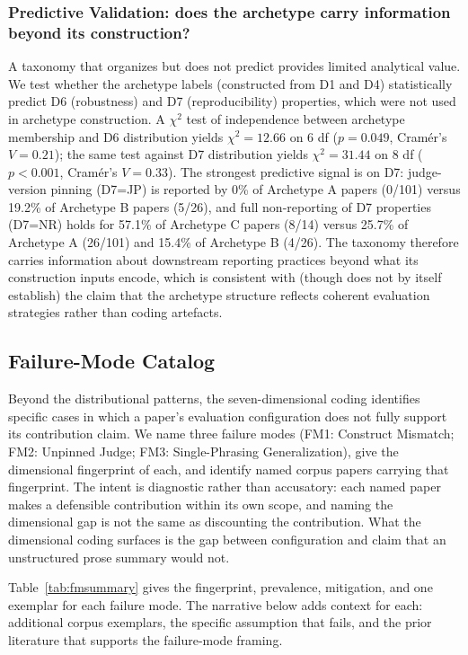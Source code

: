 \documentclass[acmsmall, nonacm, screen]{acmart}
\begin{document}
\subsubsection{Predictive Validation: does the archetype carry information beyond its construction?}
\label{subsubsec:predictive}
A taxonomy that organizes but does not predict provides limited
analytical value. We test whether the archetype labels (constructed
from D1 and D4) statistically predict D6 (robustness) and D7
(reproducibility) properties, which were not used in archetype
construction. A $\chi^2$ test of independence between archetype
membership and D6 distribution yields $\chi^2 = 12.66$ on 6 df
($p = 0.049$, Cram\'er's $V = 0.21$); the same test against D7
distribution yields $\chi^2 = 31.44$ on 8 df ($p < 0.001$,
Cram\'er's $V = 0.33$). The strongest predictive signal is on D7:
judge-version pinning (D7=JP) is reported by 0\% of Archetype A
papers (0/101) versus 19.2\% of Archetype B papers (5/26), and full
non-reporting of D7 properties (D7=NR) holds for 57.1\% of Archetype
C papers (8/14) versus 25.7\% of Archetype A (26/101) and 15.4\% of
Archetype B (4/26). The taxonomy therefore carries information about
downstream reporting practices beyond what its construction inputs
encode, which is consistent with (though does not by itself
establish) the claim that the archetype structure reflects coherent
evaluation strategies rather than coding artefacts.

\subsection{Failure-Mode Catalog}
\label{subsec:failuremodes}

Beyond the distributional patterns, the seven-dimensional coding
identifies specific cases in which a paper's evaluation configuration
does not fully support its contribution claim. We name three failure
modes (FM1: Construct Mismatch; FM2: Unpinned Judge; FM3:
Single-Phrasing Generalization), give the dimensional fingerprint of
each, and identify named corpus papers carrying that fingerprint. The intent is
diagnostic rather than accusatory: each named paper makes a defensible
contribution within its own scope, and naming the dimensional gap is
not the same as discounting the contribution. What the dimensional
coding surfaces is the gap between configuration and claim that an
unstructured prose summary would not.

Table~\ref{tab:fmsummary} gives the fingerprint, prevalence,
mitigation, and one exemplar for each failure mode. The narrative
below adds context for each: additional corpus exemplars, the
specific assumption that fails, and the prior literature that
supports the failure-mode framing.
\end{document}
